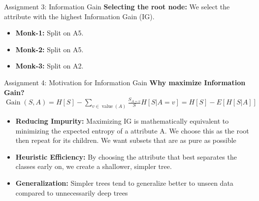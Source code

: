 \documentclass{beamer}
\begin{document}
\begin{frame}{Assignment 3: Information Gain}
    \textbf{Selecting the root node:} We select the attribute with the highest Information Gain (IG).

    \begin{table}[]
        \centering
    \end{table}
    
    \begin{itemize}
        \item \textbf{Monk-1:} Split on A5.
        \item \textbf{Monk-2:} Split on A5.
        \item \textbf{Monk-3:} Split on A2.
    \end{itemize}
\end{frame}

\begin{frame}{Assignment 4: Motivation for Information Gain}
    \textbf{Why maximize Information Gain?} \\
    $\operatorname{Gain}(S,A) = H[S] - \sum_{v \in \operatorname{value}(A)} \frac{S_{A=v}}{S}H[S|A=v] = H[S] - E[H[S|A]]$ \\ 
    \begin{itemize}
        \item \textbf{Reducing Impurity:} Maximizing IG is mathematically equivalent to minimizing the expected entropy 
            of a attribute A. We choose this as the root then repeat for its children.
            We want subsets that are as pure as possible
        \item \textbf{Heuristic Efficiency:} By choosing the attribute that best separates the classes early on, we create a shallower, simpler tree.
        \item \textbf{Generalization:} Simpler trees tend to generalize better to unseen data compared to unnecessarily deep trees
    \end{itemize}
\end{frame}
\end{document}
